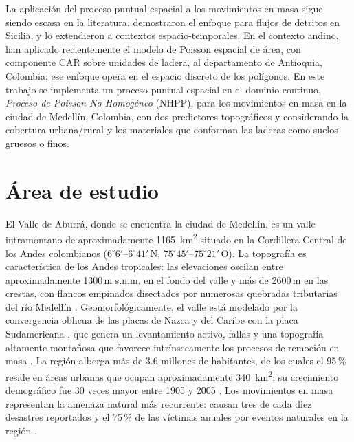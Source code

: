 \documentclass[12pt, a4paper]{article}
\begin{document}
La aplicación del proceso puntual espacial a los movimientos en masa sigue siendo
escasa en la literatura. \citet{lombardo2019} demostraron el enfoque para flujos de
detritos en Sicilia, y \citet{lombardo2020} lo extendieron a contextos
espacio-temporales. En el contexto andino, \citet{aristizabal2025ag} han aplicado recientemente el
modelo de Poisson espacial de área, con componente CAR sobre unidades de
ladera, al departamento de Antioquia, Colombia; ese enfoque opera en el espacio
discreto de los polígonos. En este trabajo se implementa un proceso puntual espacial en el
dominio continuo, \emph{Proceso de Poisson No Homogéneo} (NHPP), para los movimientos en masa en la ciudad de Medellín,
Colombia, con dos predictores topográficos y considerando la cobertura urbana/rural
y los materiales que conforman las laderas como suelos gruesos o finos.

\section{Área de estudio}
\label{sec:study_area}

El Valle de Aburrá, donde se encuentra la ciudad de Medellín, es un valle intramontano
de aproximadamente \SI{1165}{km^2} situado en la Cordillera Central de los Andes
colombianos ($6^\circ6'$--$6^\circ41'$\,N, $75^\circ45'$--$75^\circ21'$\,O). La topografía es
característica de los Andes tropicales: las elevaciones oscilan entre aproximadamente
1300\,m s.n.m. en el fondo del valle y más de 2600\,m en las crestas, con flancos
empinados disectados por numerosas quebradas tributarias del río Medellín
\citep{aristizabal2026}. Geomorfológicamente, el valle está modelado
por la convergencia oblicua de las placas de Nazca y del Caribe con la placa
Sudamericana \citep{trenkamp2002, cediel2003}, que genera un levantamiento activo,
fallas y una topografía altamente montañosa que favorece intrínsecamente
los procesos de remoción en masa \citep{aristizabal2025}. La región alberga más de
3.6 millones de habitantes, de los cuales el 95\,\% reside en áreas urbanas que
ocupan aproximadamente \SI{340}{km^2}; su crecimiento demográfico fue 30 veces mayor
entre 1905 y 2005 \citep{aristizabal2026}. Los movimientos en masa representan la
amenaza natural más recurrente: causan tres de cada diez desastres reportados y el
75\,\% de las víctimas anuales por eventos naturales en la región
\citep{gomez2023}.
\end{document}
